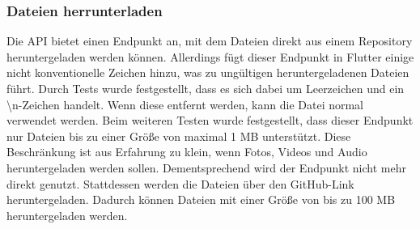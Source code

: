 \subsubsection{Dateien herrunterladen}%
Die API bietet einen Endpunkt an, mit dem Dateien direkt aus einem Repository heruntergeladen werden können\cite{imp_github_1mb100mbDownloadFile}. %
	Allerdings fügt dieser Endpunkt in Flutter einige nicht konventionelle Zeichen hinzu, was zu ungültigen heruntergeladenen Dateien führt. Durch Tests wurde festgestellt, dass es sich dabei um Leerzeichen und ein \textbackslash n-Zeichen handelt. Wenn diese entfernt werden, kann die Datei normal verwendet werden.%
\newline%
Beim weiteren Testen wurde festgestellt, dass dieser Endpunkt nur Dateien bis zu einer Größe von maximal 1 MB unterstützt. Diese Beschränkung ist aus Erfahrung zu klein, wenn Fotos, Videos und Audio heruntergeladen werden sollen. %
Dementsprechend wird der Endpunkt nicht mehr direkt genutzt. Stattdessen werden die Dateien über den GitHub-Link heruntergeladen. Dadurch können Dateien mit einer Größe von bis zu 100 MB heruntergeladen werden.%
